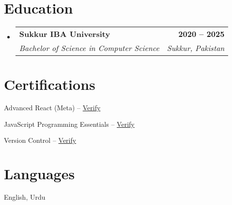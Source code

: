 \documentclass[letterpaper,11pt]{article}
\makeatletter
\newcommand{\resumeSubheading}[4]{\vspace{-2pt}\item
  \begin{tabular*}{1.0\textwidth}[t]{l@{\extracolsep{\fill}}r}
    \textbf{#1} & \textbf{\small #2} \\
    \textit{\small#3} & \textit{\small #4} \\
  \end{tabular*}\vspace{-7pt}}
\newcommand{\resumeSubHeadingListStart}{\begin{itemize}[leftmargin=0.0in, label={}]}
\newcommand{\resumeSubHeadingListEnd}{\end{itemize}}
\makeatother
\begin{document}
\section{Education}
\resumeSubHeadingListStart
  \resumeSubheading
    {Sukkur IBA University}{2020 – 2025}
    {Bachelor of Science in Computer Science}{Sukkur, Pakistan}
\resumeSubHeadingListEnd

\section{Certifications}
\begin{itemize}[leftmargin=0.15in, label={}]
  \small{
    \item Advanced React (Meta) – \href{https://coursera.org/verify/DKFVGNGTDNLS}{Verify}
    \item JavaScript Programming Essentials – \href{https://coursera.org/verify/HV7GT74STZDK}{Verify}
    \item Version Control – \href{https://coursera.org/verify/PDVNWGKQ846S}{Verify}
  }
\end{itemize}

\section{Languages}
English, Urdu
\end{document}
